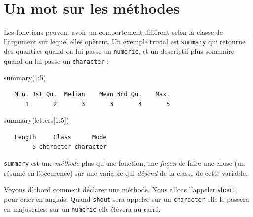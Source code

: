 \documentclass[
  letterpaper,
  DIV=11,
  numbers=noendperiod]{scrreprt}
\newenvironment{Shaded}{\begin{snugshade}}{\end{snugshade}}
\newcommand{\DecValTok}[1]{\textcolor[rgb]{0.68,0.00,0.00}{#1}}
\newcommand{\FunctionTok}[1]{\textcolor[rgb]{0.28,0.35,0.67}{#1}}
\newcommand{\NormalTok}[1]{\textcolor[rgb]{0.00,0.23,0.31}{#1}}
\newcommand{\SpecialCharTok}[1]{\textcolor[rgb]{0.37,0.37,0.37}{#1}}
\begin{document}
\hypertarget{un-mot-sur-les-muxe9thodes}{%
\section{Un mot sur les méthodes}\label{un-mot-sur-les-muxe9thodes}}

Les fonctions peuvent avoir un comportement différent selon la classe de
l'argument sur lequel elles opèrent. Un exemple trivial est
\texttt{summary} qui retourne des quantiles quand on lui passe un
\texttt{numeric}, et un descriptif plus sommaire quand on lui passe un
\texttt{character} :

\begin{Shaded}
\begin{Highlighting}[]
\FunctionTok{summary}\NormalTok{(}\DecValTok{1}\SpecialCharTok{:}\DecValTok{5}\NormalTok{)}
\end{Highlighting}
\end{Shaded}

\begin{verbatim}
   Min. 1st Qu.  Median    Mean 3rd Qu.    Max. 
      1       2       3       3       4       5 
\end{verbatim}

\begin{Shaded}
\begin{Highlighting}[]
\FunctionTok{summary}\NormalTok{(letters[}\DecValTok{1}\SpecialCharTok{:}\DecValTok{5}\NormalTok{])}
\end{Highlighting}
\end{Shaded}

\begin{verbatim}
   Length     Class      Mode 
        5 character character 
\end{verbatim}

\texttt{summary} est une \emph{méthode} plus qu'une fonction, une
\emph{façon} de faire une chose (un résumé en l'occurence) sur une
variable qui \emph{dépend} de la classe de cette variable.

Voyons d'abord comment déclarer une méthode. Nous allons l'appeler
\texttt{shout}, pour crier en anglais. Quand \texttt{shout} sera appelée
sur un \texttt{character} elle le passera en majuscules; sur un
\texttt{numeric} elle élèvera au carré.
\end{document}

